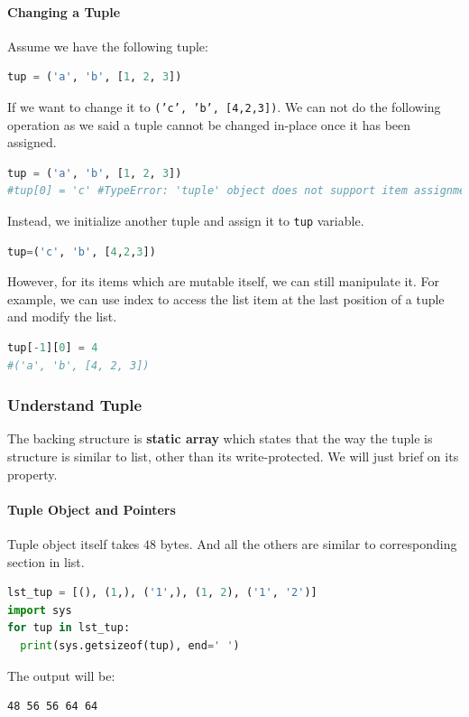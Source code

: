 \documentclass[../main.tex]{subfiles}
\begin{document}
\paragraph{Changing a Tuple} Assume we have the following tuple:
\begin{lstlisting}[language=Python]
tup = ('a', 'b', [1, 2, 3])
\end{lstlisting}
If we want to change it to \texttt{('c', 'b', [4,2,3])}. We can not do the following operation as we said a tuple cannot be changed in-place once it has been assigned. 
\begin{lstlisting}[language=Python]
tup = ('a', 'b', [1, 2, 3])
#tup[0] = 'c' #TypeError: 'tuple' object does not support item assignment
\end{lstlisting}
Instead, we initialize another tuple and assign it to \texttt{tup} variable.
\begin{lstlisting}[language=Python]
tup=('c', 'b', [4,2,3])
\end{lstlisting}
However, for its items which are mutable itself, we can still manipulate it. For example,  we can use index to access the list item at the last position of a tuple and modify the list.
\begin{lstlisting}[language=Python]
tup[-1][0] = 4
#('a', 'b', [4, 2, 3])
\end{lstlisting}


\subsubsection{Understand Tuple}
The backing structure is \textbf{static array} which states that the way the tuple is structure is similar to list, other than its write-protected. We will just brief on its property.
\paragraph{Tuple Object and Pointers} Tuple object itself takes $48$ bytes. And all the others are similar to corresponding section in list.
\begin{lstlisting}[language=Python]
lst_tup = [(), (1,), ('1',), (1, 2), ('1', '2')]
import sys
for tup in lst_tup:
  print(sys.getsizeof(tup), end=' ')
\end{lstlisting}
The output will be:
\begin{lstlisting}[numbers=none]
48 56 56 64 64 
\end{lstlisting}
\end{document}
